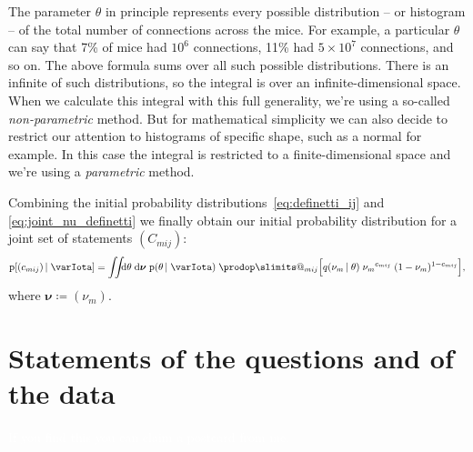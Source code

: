 \documentclass[\ifafour a4paper,12pt,\else a5paper,10pt,\fi%
onecolumn,oneside,article,%
british%
]{memoir}
\makeatletter
\theoremstyle{remark}
\theoremstyle{innote}
\def\prod{\DOTSI\prodop\slimits@}
\newcommand*{\di}{\mathrm{d}}%
\newcommand*{\defd}{\coloneqq}
\newcommand*{\pf}{\mathrm{p}}%
\renewcommand*{\|}[1][]{\nonscript\,#1\vert\nonscript\;\mathopen{}}
\newcommand*{\yI}{\varIota}
\newcommand*{\yC}{C}
\newcommand*{\yc}{c}
\newcommand*{\yq}{q}
\newcommand*{\yth}{\theta}
\newcommand*{\ynu}{\bm{\nu}}
\makeatother
\begin{document}
The parameter $\yth$ in principle represents every possible distribution --
or histogram -- of the total number of connections across the mice. For
example, a particular $\yth$ can say that 7\% of mice had $10^6$
connections, 11\% had $5\times 10^{7}$ connections, and so on. The above
formula sums over all such possible distributions. There is an infinite of
such distributions, so the integral is over an infinite-dimensional space.
When we calculate this integral with this full generality, we're using a
so-called \emph{non-parametric} method. But for mathematical simplicity we
can also decide to restrict our attention to histograms of specific shape,
such as a normal for example. In this case the integral is restricted to a
finite-dimensional space and we're using a \emph{parametric} method.

\medskip

Combining the initial probability distributions~\eqref{eq:definetti_ij} and
\eqref{eq:joint_nu_definetti} we finally obtain our initial probability
distribution for a joint set of statements $(\yC_{mij})$:
\begin{equation}
  \label{eq:main_init_prob_simplified}
    \pf[(\yc_{mij}) \| \yI] =
    \iint\!\!\!\di\yth\;\di\ynu\;
    \pf(\yth \| \yI)\;
    \prod_{mij}\Bigl[ \yq(\nu_{m} \| \yth)\;
  {\nu_{m}}^{\yc_{mij}}\;(1-\nu_{m})^{1-\yc_{mij}}
  \Bigr],
\end{equation}
where $\ynu \defd (\nu_{m})$.



\section{Statements of the questions and of the data}
\label{sec:statements_question_data}














\textcolor{white}{If you find this you can claim a postcard from me.}
\end{document}
